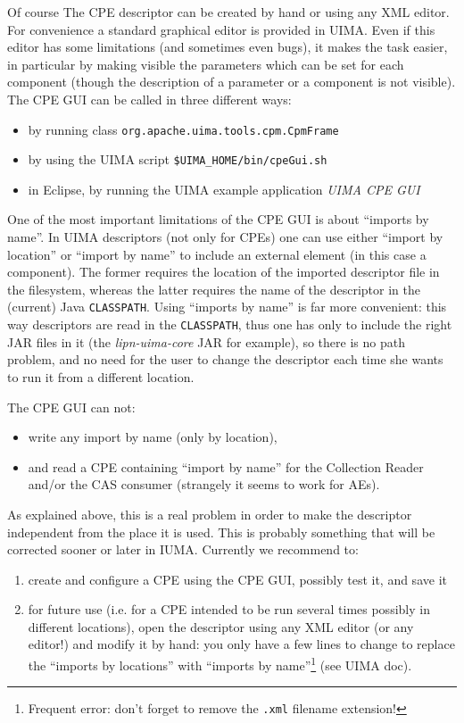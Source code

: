 \documentclass{article}
\newenvironment{xenumerate}{
\begin{enumerate}
  \setlength{\itemsep}{.3\baselineskip}
  \setlength{\topsep}{0pt}
  \setlength{\parskip}{0pt}
  \setlength{\parsep}{0pt}
}{\end{enumerate}}
\newenvironment{xitemize}{
\begin{itemize}
  \setlength{\itemsep}{.3\baselineskip}
  \setlength{\topsep}{0pt}
  \setlength{\parskip}{0pt}
  \setlength{\parsep}{0pt}
}{\end{itemize}}
\newcommand{\uimaModule}{{\em lipn-uima-core}\xspace}
\begin{document}
Of course The CPE descriptor can be created by hand or using any XML editor. For convenience a standard graphical editor is provided in UIMA. Even if this editor has some limitations (and sometimes even bugs), it makes the task easier, in particular by making visible the parameters which can be set for each component (though the description of a parameter or a component is not visible). The CPE GUI can be called in three different ways:

\begin{xitemize}
\item by running class {\tt org.apache.uima.tools.cpm.CpmFrame}
\item by using the UIMA script {\tt \$UIMA\_HOME/bin/cpeGui.sh}
\item in Eclipse, by running the UIMA example application {\em UIMA CPE GUI}
\end{xitemize}

\label{partImportsCpeGui}
One of the most important limitations of the CPE GUI is about ``imports by name''. In UIMA descriptors (not only for CPEs) one can use either ``import by location'' or ``import by name'' to include an external element (in this case a component). The former requires the location of the imported descriptor file in the filesystem, whereas the latter requires the name of the descriptor in the (current) Java {\tt CLASSPATH}. Using ``imports by name'' is far more convenient: this way descriptors are read in the {\tt CLASSPATH}, thus one has only to include the right JAR files in it (the \uimaModule JAR for example), so there is no path problem, and no need for the user to change the descriptor each time she wants to run it from a different location.

The CPE GUI can not:
\begin{xitemize}
\item write any import by name (only by location),
\item and read a CPE containing ``import by name'' for the Collection Reader and/or the CAS consumer (strangely it seems to work for AEs).
\end{xitemize}

As  explained above, this is a real problem in order to make the descriptor independent from the place it is used. This is probably something that will be corrected sooner or later in IUMA. Currently we recommend to: 
\begin{xenumerate}
\item create and configure a CPE using the CPE GUI, possibly test it, and save it
\item for future use (i.e. for a CPE intended to be run several times possibly in different locations), open the descriptor using any XML editor (or any editor!) and modify it by hand: you only have a few lines to change to replace the ``imports by locations'' with ``imports by name''\footnote{Frequent error: don't forget to remove the {\tt .xml} filename extension!} (see UIMA doc).
\end{xenumerate}
\end{document}
